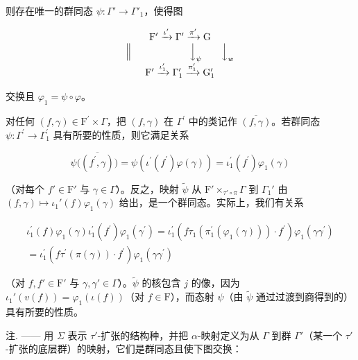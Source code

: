 则存在唯一的群同态 \(\psi : \Gamma' \to \Gamma'_1\)，使得图

\[
\begin{array}{c} \mathrm{F} ^ {\prime} \xrightarrow {\iota^ {\prime}} \Gamma^ {\prime} \xrightarrow {\pi^ {\prime}} \mathrm{G} \\ \Big \| \qquad \qquad \qquad \Big \downarrow_ {\psi} \qquad \Big \downarrow_ {w} \\ \mathrm{F} ^ {\prime} \xrightarrow {\iota_ {1} ^ {\prime}} \Gamma_ {1} ^ {\prime} \xrightarrow {\pi_ {1} ^ {\prime}} \mathrm{G} _ {1} ^ {\prime} \end{array}
\]

交换且 \(\varphi_{1} = \psi \circ \varphi\)。

对任何 \((f,\gamma)\in\mathrm{F}^{\prime}\times\Gamma\)，把 \((f,\gamma)\) 在 \(\Gamma^{\prime}\) 中的类记作 \(\overline{(f,\gamma)}\)。若群同态 \(\psi:\Gamma^{\prime}\to\Gamma_{1}^{\prime}\) 具有所要的性质，则它满足关系

\[
\psi \big (\overline {{(f ^ {\prime} , \gamma)}} \big) = \psi (\iota^ {\prime} (f ^ {\prime}) \varphi (\gamma)) = \iota_ {1} ^ {\prime} (f ^ {\prime}) \varphi_ {1} (\gamma)
\]

（对每个 \(f' \in \mathrm{F}'\) 与 \(\gamma \in \Gamma\)）。反之，映射 \(\tilde{\psi}\) 从 \(\mathrm{F}' \times_{\tau' \circ \pi} \Gamma\) 到 \(\Gamma_1'\) 由 \((f, \gamma) \mapsto \iota_1'(f) \varphi_1(\gamma)\) 给出，是一个群同态。实际上，我们有关系

\[
\begin{array}{r} \iota_ {1} ^ {\prime} (f) \varphi_ {1} (\gamma) \iota_ {1} ^ {\prime} (f ^ {\prime}) \varphi_ {1} (\gamma^ {\prime}) = \iota_ {1} ^ {\prime} (f \tau_ {1} (\pi_ {1} ^ {\prime} (\varphi_ {1} (\gamma))) \cdot f ^ {\prime}) \varphi_ {1} (\gamma \gamma^ {\prime}) \\ = \iota_ {1} ^ {\prime} (f \tau^ {\prime} (\pi (\gamma)) \cdot f ^ {\prime}) \varphi_ {1} (\gamma \gamma^ {\prime}) \end{array}
\]

（对 \(f, f' \in \mathrm{F}'\) 与 \(\gamma, \gamma' \in \Gamma\)）。\(\widetilde{\psi}\) 的核包含 \(j\) 的像，因为 \(\iota_1'(v(f)) = \varphi_1(\iota(f))\)（对 \(f \in \mathrm{F}\)），而态射 \(\psi\)（由 \(\widetilde{\psi}\) 通过过渡到商得到的）具有所要的性质。

注. —— 用 \(\Sigma\) 表示 \(\tau'\)-扩张的结构种，并把 \(\alpha\)-映射定义为从 \(\Gamma\) 到群 \(\Gamma'\)（某一个 \(\tau'\)-扩张的底层群）的映射，它们是群同态且使下图交换：

